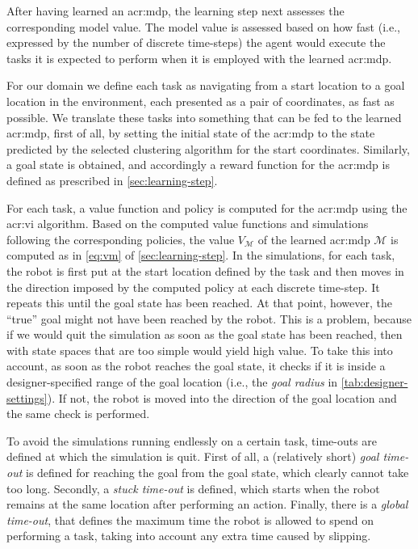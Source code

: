 After having learned an \acrshort{acr:mdp}, the learning step next assesses the corresponding model value.
The model value is assessed based on how fast (i.e., expressed by the number of discrete time-steps) the agent would execute the tasks it is expected to perform when it is employed with the learned \acrshort{acr:mdp}.

For our domain we define each task as navigating from a start location to a goal location in the environment, each presented as a pair of coordinates, as fast as possible.
We translate these tasks into something that can be fed to the learned \acrshort{acr:mdp}, first of all, by setting the initial state of the \acrshort{acr:mdp} to the state predicted by the selected clustering algorithm for the start coordinates.
Similarly, a goal state is obtained, and accordingly a reward function for the \acrshort{acr:mdp} is defined as prescribed in \autoref{sec:learning-step}.

For each task, a value function and policy is computed for the \acrshort{acr:mdp} using the \acrshort{acr:vi} algorithm.
Based on the computed value functions and simulations following the corresponding policies, the value $V_\mathcal{M}$ of the learned \acrshort{acr:mdp} $\mathcal{M}$ is computed as in \autoref{eq:vm} of \autoref{sec:learning-step}.
In the simulations, for each task, the robot is first put at the start location defined by the task and then moves in the direction imposed by the computed policy at each discrete time-step.
It repeats this until the goal state has been reached.
At that point, however, the ``true'' goal might not have been reached by the robot.
This is a problem, because if we would quit the simulation as soon as the goal state has been reached, then  with state spaces that are too simple would yield high value.
To take this into account, as soon as the robot reaches the goal state, it checks if it is inside a designer-specified range of the goal location (i.e., the \textit{goal radius} in \autoref{tab:designer-settings}).
If not, the robot is moved into the direction of the goal location and the same check is performed.

To avoid the simulations running endlessly on a certain task, time-outs are defined at which the simulation is quit.
First of all, a (relatively short) \textit{goal time-out} is defined for reaching the goal from the goal state, which clearly cannot take too long.
Secondly, a \textit{stuck time-out} is defined, which starts when the robot remains at the same location after performing an action.
Finally, there is a \textit{global time-out}, that defines the maximum time the robot is allowed to spend on performing a task, taking into account any extra time caused by slipping.

